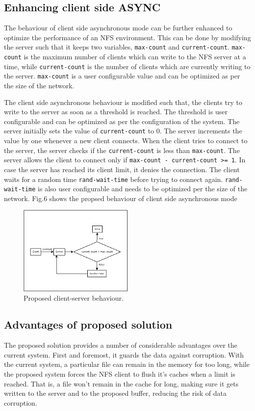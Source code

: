 \documentclass[conference]{IEEEtran}
\begin{document}
\subsection{Enhancing client side ASYNC }\label{SCM}
The behaviour of client side asynchronous mode can be further enhanced to 
optimize the performance of an NFS environment. This can be done by
modifying the server such that it keeps two variables, \texttt{max-count} and 
\texttt{current-count}. \texttt{max-count} is the maximum number of clients which can write 
to the NFS server at a time, while \texttt{current-count} is the number of clients 
which are currently writing to the server. \texttt{max-count} is a user configurable
value and can be optimized as per the size of the network.

The client side asynchronous behaviour is modified such that, the clients 
try to write to the server as soon as a threshold is reached. The threshold
is user configurable and can be optimized as per the configuration of the
system. The server initially sets the value of \texttt{current-count}  to 0. The 
server increments the value by one whenever a new client connects. When the
client tries to connect to the server, the server checks if the
\texttt{current-count} is less than \texttt{max-count}. The server allows the client to
connect only if \texttt{max-count - current-count >= 1}. In case the server has
reached its client limit, it denies the connection. The client waits for a
random time \texttt{rand-wait-time} before trying to connect again. \texttt{rand-wait-time} 
is also user configurable and needs to be optimized per the size of the
network. Fig.6 shows the propsed behaviour of client side asynchronous mode
\begin{figure}[htbp]
\centerline{\includegraphics[width=0.5\textwidth,natwidth=400,natheight=100]{enhancing_client_async.png}}
\caption{Proposed client-server behaviour.}
\label{fig}
\end{figure}

\subsection{Advantages of proposed solution}
The proposed solution provides a number of considerable advantages over the
current system. First and foremost, it guards the data against corruption.
With the current system, a particular file can remain in the memory for too
long, while the proposed system forces the NFS client to flush it's caches
when a limit is reached. That is, a file won't remain in the cache for long,
making sure it gets written to the server and to the proposed buffer,
reducing the risk of data corruption.
\end{document}
